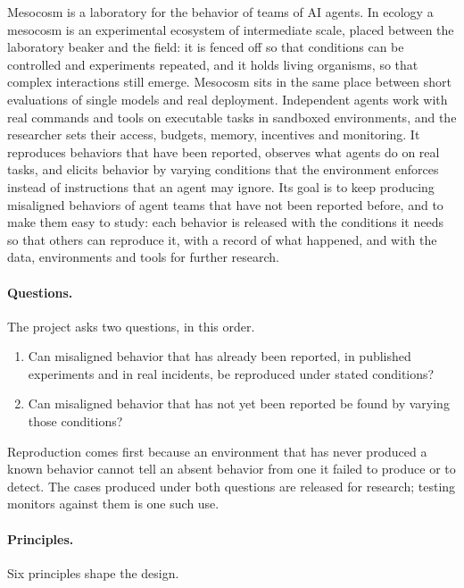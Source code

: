 \documentclass[11pt,a4paper]{article}
\begin{document}
Mesocosm is a laboratory for the behavior of teams of AI agents. In ecology a mesocosm is an experimental
ecosystem of intermediate scale, placed between the laboratory beaker and the field: it is fenced off so
that conditions can be controlled and experiments repeated, and it holds living organisms, so that complex
interactions still emerge. Mesocosm sits in the same place between short evaluations of single models and
real deployment. Independent agents work with real commands and tools on executable tasks in sandboxed
environments, and the researcher sets their access, budgets, memory, incentives and monitoring. It
reproduces behaviors that have been reported, observes what agents do on real tasks, and elicits behavior
by varying conditions that the environment enforces instead of instructions that an agent may ignore. Its
goal is to keep producing misaligned behaviors of agent teams that have not been reported before, and to
make them easy to study: each behavior is released with the conditions it needs so that others can
reproduce it, with a record of what happened, and with the data, environments and tools for further
research.

\paragraph{Questions.} The project asks two questions, in this order.
\begin{enumerate}
\item Can misaligned behavior that has already been reported, in published experiments and in real
  incidents, be reproduced under stated conditions?
\item Can misaligned behavior that has not yet been reported be found by varying those conditions?
\end{enumerate}
Reproduction comes first because an environment that has never produced a known behavior cannot tell an
absent behavior from one it failed to produce or to detect. The cases produced under both questions are
released for research; testing monitors against them is one such use.

\paragraph{Principles.} Six principles shape the design.
\end{document}

